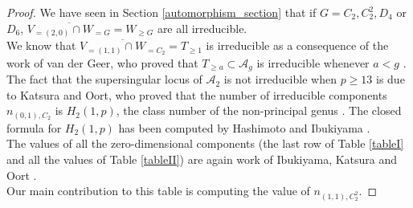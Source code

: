 \documentclass{amsart}
\newcommand{\calA}{\mathcal{A}}
\numberwithin{equation}{section}
\theoremstyle{definition}
\theoremstyle{remark}
\begin{document}
\begin{proof}
We have seen in Section \ref{automorphism_section} that if $G=C_2, C_{2}^2, D_4$ or $D_6$, $\overline{V_{=(2,0)}\cap W_{= G}}=W_{\geq G}$ are all irreducible.\\

We know that $\overline{V_{=(1,1)}\cap W_{= C_2}}=T_{\geq1}$ is irreducible as a consequence of the work of van der Geer, who proved that $T_{\geq a}\subset\calA_g$ is irreducible whenever $a<g$ \cite[Theorem 2.11]{vanderGeer1999CyclesVarieties}.\\

The fact that the supersingular locus of $\calA_2$ is not irreducible when $p\geq13$ is due to Katsura and Oort, who proved that the number of irreducible components $n_{(0,1),C_2}$ is $H_2(1,p)$, the class number of the non-principal genus \cite{Katsura1987FamiliesSurfaces}. The closed formula for $H_2(1,p)$ has been computed by Hashimoto and Ibukiyama \cite{Hashimoto1980OnForms}.\\


The values of all the zero-dimensional components (the last row of Table \ref{tableI} and all the values of Table \ref{tableII}) are again work of Ibukiyama, Katsura and Oort \cite[Propositions 1.11-1.13 and Theorem 3.3]{Ibukiyama1986SupersingularNumbers}.\\

Our main contribution to this table is computing the value of $n_{(1,1),C_2^2}$.
\end{proof}
\end{document}
